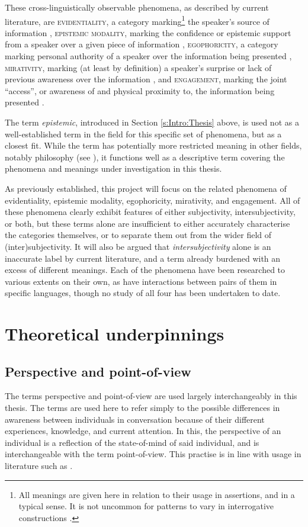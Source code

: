 These cross-linguistically observable phenomena, as described by current literature, are \textsc{evidentiality}, a category marking\footnote{All meanings are given here in relation to their usage in assertions, and in a typical sense. It is not uncommon for patterns to vary in interrogative constructions \cite{Aikhenvald2018Intro}.} the speaker's source of information \cite{SanRoque2019Evidentiality}, \textsc{epistemic modality}, marking the confidence or epistemic support from a speaker over a given piece of information \cite{Boye2012}, \textsc{egophoricity}, a category marking personal authority of a speaker over the information being presented \cite{EgoIntro}, \textsc{mirativity}, marking (at least by definition) a speaker's surprise or lack of previous awareness over the information \cite{DeLancey2012}, and \textsc{engagement}, marking the joint ``access'', or awareness of and physical proximity to, the information being presented \cites{EvansBergqvistSanRoque2018a}{EvansBergqvistSanRoque2018b}.

The term \textit{epistemic}, introduced in Section \ref{s:Intro:Thesis} above, is used not as a well-established term in the field for this specific set of phenomena, but as a closest fit. While the term has potentially more restricted meaning in other fields, notably philosophy (see ), it functions well as a descriptive term covering the phenomena and meanings under investigation in this thesis. 

As previously established, this project will focus on the related phenomena of evidentiality, epistemic modality, egophoricity, mirativity, and engagement. All of these phenomena clearly exhibit features of either subjectivity, intersubjectivity, or both, but these terms alone are insufficient to either accurately characterise the categories themselves, or to separate them out from the wider field of (inter)subjectivity. It will also be argued that \textit{intersubjectivity} alone is an inaccurate label by current literature, and a term already burdened with an excess of different meanings. Each of the phenomena have been researched to various extents on their own, as have interactions between pairs of them in specific languages, though no study of all four has been undertaken to date.

\section{Theoretical underpinnings}\label{s:Intro:Theory}
\subsection{Perspective and point-of-view}\label{ss:Intro:PerspPOVDefs}
The terms perspective and point-of-view are used largely interchangeably in this thesis. The terms are used here to refer simply to the possible differences in awareness between individuals in conversation because of their different experiences, knowledge, and current attention. In this, the perspective of an individual is a reflection of the state-of-mind of said individual, and is interchangeable with the term point-of-view. This practise is in line with usage in literature such as . 

